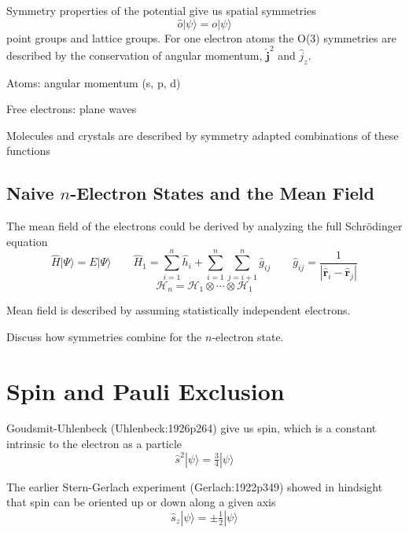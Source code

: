 Symmetry properties of the potential give us spatial symmetries
\begin{equation}
    \hat{o}
    |\psi\rangle
    =
    o
    |\psi\rangle
\end{equation}
point groups and lattice groups.
For one electron atoms the O(3) symmetries are described by the conservation of
angular momentum, \(\hat{\mathbf{j}}^2\) and \(\hat{j}_z\).

\noindent
Atoms: angular momentum (s, p, d)

\noindent
Free electrons: plane waves

\noindent
Molecules and crystals are described by symmetry adapted combinations of these
functions

\subsection{Naive \(n\)-Electron States and the Mean Field}
The mean field of the electrons could be derived by analyzing the full
Schr\"odinger equation
\begin{equation}
    \hat{H}
    |\Psi\rangle
    =
    E
    |\Psi\rangle
    \qquad
    \hat{H}_1
    =
    \sum_{i=1}^n
    \hat{h}_i
    +
    \sum_{i=1}^n
    \sum_{j=i+1}^n
    \hat{g}_{ij}
    \qquad
    \hat{g}_{ij}
    =
    \frac{1}{|\hat{\mathbf{r}}_i-\hat{\mathbf{r}}_j|}
\end{equation}
\begin{equation}
    \mathcal{H}_n
    =
    \mathcal{H}_1
    \otimes
    \cdots
    \otimes
    \mathcal{H}_1
\end{equation}

Mean field is described by assuming statistically independent electrons.

Discuss how symmetries combine for the \(n\)-electron state.

\section{Spin and Pauli Exclusion}

Goudsmit-Uhlenbeck (Uhlenbeck:1926p264) give us spin, which is a constant intrinsic to the electron
as a particle
\begin{equation}
    \hat{s}^2
    |\psi\rangle
    =
    \tfrac{3}{4}
    |\psi\rangle
\end{equation}

The earlier Stern-Gerlach experiment (Gerlach:1922p349) showed in hindsight that
spin can be oriented up or down along a given axis
\begin{equation}
    \hat{s}_z
    |\psi\rangle
    =
    \pm
    \tfrac{1}{2}
    |\psi\rangle
\end{equation}

